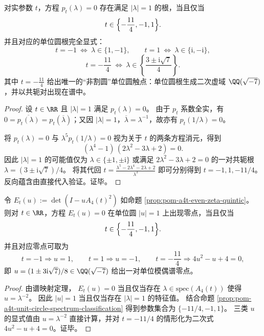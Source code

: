 \begin{proposition}[单位圆谱点的完全分类：仅三处实参数触碰 \texorpdfstring{$|\lambda|=1$}{|lambda|=1}]\label{prop:pom-a4t-unit-circle-spectrum-classification}
对实参数 \(t\)，方程 \(p_t(\lambda)=0\) 存在满足 \(|\lambda|=1\) 的根，当且仅当
\[
t\in\Bigl\{-\frac{11}{4},-1,1\Bigr\}.
\]
并且对应的单位圆根完全显式：
\[
t=-1\ \Longleftrightarrow\ \lambda\in\{1,-1\},
\qquad
t=1\ \Longleftrightarrow\ \lambda\in\{\mathrm{i},-\mathrm{i}\},
\]
\[
t=-\frac{11}{4}
\ \Longleftrightarrow\
\lambda\in\left\{\frac{3\pm \mathrm{i}\sqrt7}{4}\right\}.
\]
其中 \(t=-\frac{11}{4}\) 给出唯一的“非割圆”单位圆触点：单位圆根生成二次虚域 \(\QQ(\sqrt{-7})\)，并以共轭对出现在谱中。
\end{proposition}
\begin{proof}
设 \(t\in\RR\) 且 \(|\lambda|=1\) 满足 \(p_t(\lambda)=0\)。
由于 \(p_t\) 系数全实，有 \(0=\overline{p_t(\lambda)}=p_t(\overline\lambda)\)；又因 \(|\lambda|=1\)，\(\overline\lambda=\lambda^{-1}\)，故亦有 \(p_t(1/\lambda)=0\)。
\par
将 \(p_t(\lambda)=0\) 与 \(\lambda^5p_t(1/\lambda)=0\) 视为关于 \(t\) 的两条方程消元，得到
\[
(\lambda^4-1)\,(2\lambda^2-3\lambda+2)=0.
\]
因此 \(|\lambda|=1\) 的可能值仅为 \(\lambda\in\{\pm1,\pm\mathrm{i}\}\) 或满足 \(2\lambda^2-3\lambda+2=0\) 的一对共轭根 \(\lambda=(3\pm \mathrm{i}\sqrt7)/4\)。
将其代回
\(
t=\frac{\lambda^5-2\lambda^4-2\lambda+2}{\lambda^3}
\)
即可分别得到 \(t=-1,1,-11/4\)。
反向蕴含由直接代入验证。证毕。
\end{proof}


\begin{corollary}\label{cor:pom-a4t-even-spectrum-unit-circle-touchpoints}
令 \(E_t(u):=\det(I-uA_4(t)^2)\) 如命题 \ref{prop:pom-a4t-even-zeta-quintic}。
则对 \(t\in\RR\)，方程 \(E_t(u)=0\) 在单位圆 \(|u|=1\) 上出现零点，当且仅当
\[
t\in\Bigl\{-\frac{11}{4},-1,1\Bigr\}.
\]
并且对应零点可取为
\[
t=-1\Rightarrow u=1,
\qquad
t=1\Rightarrow u=-1,
\qquad
t=-\frac{11}{4}\Rightarrow 4u^{2}-u+4=0,
\]
即 \(u=(1\pm 3\mathrm{i}\sqrt7)/8\in\QQ(\sqrt{-7})\) 给出一对单位模偶谱零点。
\end{corollary}
\begin{proof}
由谱映射定理，
\(
E_t(u)=0
\)
当且仅当存在 \(\lambda\in\mathrm{spec}(A_4(t))\) 使得 \(u=\lambda^{-2}\)。
因此 \(|u|=1\) 当且仅当存在 \(|\lambda|=1\) 的特征值。
结合命题 \ref{prop:pom-a4t-unit-circle-spectrum-classification} 得到参数集合为 \(\{-11/4,-1,1\}\)。
三类 \(u\) 的显式值由 \(u=\lambda^{-2}\) 直接计算，并对 \(t=-11/4\) 的情形化为二次式 \(4u^2-u+4=0\)。证毕。
\end{proof}

